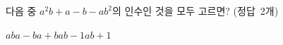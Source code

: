 다음 중 $a^2b+a-b-ab^2$의 인수인 것을 모두 고르면? \mbox{(정답 2개)}
\begin{choices32}{$ab$}{$a-b$}{$a+b$}{$ab-1$}{$ab+1$}\end{choices32}
